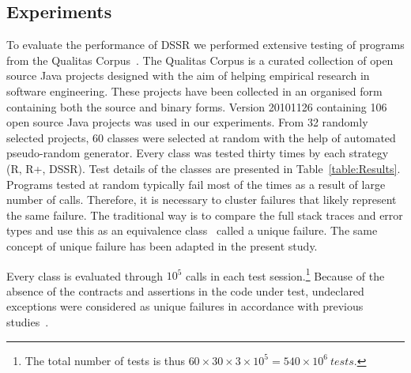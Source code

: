\documentclass[conference]{IEEEtran}
\begin{document}
\subsection{Experiments}
\noindent To evaluate the performance of DSSR we performed extensive testing of programs from the Qualitas Corpus~\cite{Tempero2010}. The Qualitas Corpus is a curated collection of open source Java projects designed with the aim of helping empirical research in  software engineering. These projects have been collected in an organised form containing both the source and binary forms. Version 20101126 containing 106 open source Java projects was used in our experiments. From 32 randomly selected projects, 60 classes were selected at random with the help of automated pseudo-random generator. Every class was tested thirty times by each strategy (R, R+, DSSR). Test details of the classes are presented in Table~\ref{table:Results}. Programs tested at random typically fail most of the times as a result of large number of calls. Therefore, it is necessary to cluster failures that likely represent the same failure. The traditional way is to compare the full stack traces and error types and use this as an equivalence class~\cite{Ciupa2007, Oriol2012} called a unique failure. The same concept of unique failure has been adapted in the present study.  

\noindent Every class is evaluated through $10^5$ calls in each test session.\footnote{The total number of tests is thus $60\times 30\times 3 \times 10^5 = 540\times 10^6~tests$.} Because of the absence of the contracts and assertions in the code under test, undeclared exceptions were considered as unique failures in accordance with previous studies~\cite{Oriol2012}.
\end{document}
